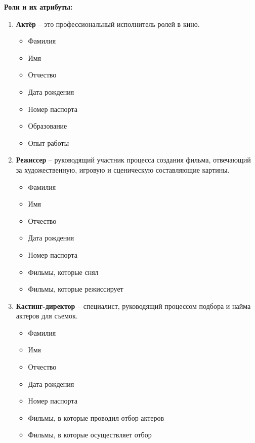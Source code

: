 \documentclass[11pt,a4paper,final]{article} %
\begin{document}
\par \textbf{Роли и их атрибуты:}
\begin{enumerate}

\item \textbf{Актёр} -- это профессиональный исполнитель ролей в кино.

  \begin{itemize}
  	\item Фамилия
  	\item Имя
  	\item Отчество
  	\item Дата рождения
  	\item Номер паспорта
  	\item Образование 
  	\item Опыт работы 
  \end{itemize}

\item \textbf{Режиссер} -- руководящий участник процесса создания фильма, отвечающий за художественную, игровую и сценическую составляющие картины.
  	\begin{itemize}
    	\item Фамилия
    	\item Имя
    	\item Отчество
    	\item Дата рождения
    	\item Номер паспорта
    	\item Фильмы, которые снял
    	\item Фильмы, которые режиссирует
  \end{itemize}

\item \textbf{Кастинг-директор} -- специалист, руководящий процессом подбора и найма актеров для съемок.
  \begin{itemize}
      \item Фамилия
      \item Имя
      \item Отчество
      \item Дата рождения
      \item Номер паспорта
      \item Фильмы, в которые проводил отбор актеров
      \item Фильмы, в которые осуществляет отбор
  \end{itemize}

\end{enumerate}
\end{document}
